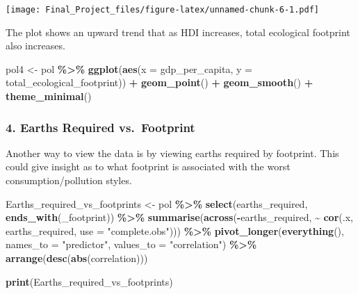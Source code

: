 \documentclass[
]{article}
\newenvironment{Shaded}{\begin{snugshade}}{\end{snugshade}}
\newcommand{\AttributeTok}[1]{\textcolor[rgb]{0.13,0.29,0.53}{#1}}
\newcommand{\FunctionTok}[1]{\textcolor[rgb]{0.13,0.29,0.53}{\textbf{#1}}}
\newcommand{\NormalTok}[1]{#1}
\newcommand{\OtherTok}[1]{\textcolor[rgb]{0.56,0.35,0.01}{#1}}
\newcommand{\SpecialCharTok}[1]{\textcolor[rgb]{0.81,0.36,0.00}{\textbf{#1}}}
\newcommand{\StringTok}[1]{\textcolor[rgb]{0.31,0.60,0.02}{#1}}
\begin{document}
\texttt{[image: Final\_Project\_files/figure-latex/unnamed-chunk-6-1.pdf]}

The plot shows an upward trend that as HDI increases, total ecological
footprint also increases.

\begin{Shaded}
\begin{Highlighting}[]
\NormalTok{pol4 }\OtherTok{\textless{}{-}}\NormalTok{ pol }\SpecialCharTok{\%\textgreater{}\%}
  \FunctionTok{ggplot}\NormalTok{(}\FunctionTok{aes}\NormalTok{(}\AttributeTok{x =}\NormalTok{ gdp\_per\_capita, }\AttributeTok{y =}\NormalTok{ total\_ecological\_footprint)) }\SpecialCharTok{+}
  \FunctionTok{geom\_point}\NormalTok{() }\SpecialCharTok{+}
  \FunctionTok{geom\_smooth}\NormalTok{() }\SpecialCharTok{+}
  \FunctionTok{theme\_minimal}\NormalTok{()}
\end{Highlighting}
\end{Shaded}

\subsubsection{4. Earths Required
vs.~Footprint}\label{earths-required-vs.-footprint}

Another way to view the data is by viewing earths required by footprint.
This could give insight as to what footprint is associated with the
worst consumption/pollution styles.

\begin{Shaded}
\begin{Highlighting}[]
\NormalTok{Earths\_required\_vs\_footprints }\OtherTok{\textless{}{-}}\NormalTok{ pol }\SpecialCharTok{\%\textgreater{}\%}
  \FunctionTok{select}\NormalTok{(earths\_required, }\FunctionTok{ends\_with}\NormalTok{(}\StringTok{\textquotesingle{}\_footprint\textquotesingle{}}\NormalTok{)) }\SpecialCharTok{\%\textgreater{}\%}
  \FunctionTok{summarise}\NormalTok{(}\FunctionTok{across}\NormalTok{(}\SpecialCharTok{{-}}\NormalTok{earths\_required, }
                   \SpecialCharTok{\textasciitilde{}} \FunctionTok{cor}\NormalTok{(.x, earths\_required, }\AttributeTok{use =} \StringTok{"complete.obs"}\NormalTok{))) }\SpecialCharTok{\%\textgreater{}\%}
  \FunctionTok{pivot\_longer}\NormalTok{(}\FunctionTok{everything}\NormalTok{(), }\AttributeTok{names\_to =} \StringTok{"predictor"}\NormalTok{, }\AttributeTok{values\_to =} \StringTok{"correlation"}\NormalTok{) }\SpecialCharTok{\%\textgreater{}\%}
  \FunctionTok{arrange}\NormalTok{(}\FunctionTok{desc}\NormalTok{(}\FunctionTok{abs}\NormalTok{(correlation)))}

\FunctionTok{print}\NormalTok{(Earths\_required\_vs\_footprints)}
\end{Highlighting}
\end{Shaded}
\end{document}
